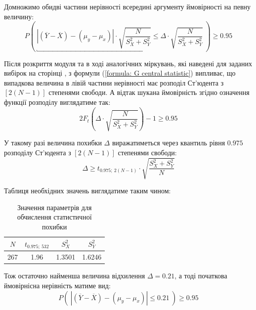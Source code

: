 Домножимо обидві частини нерівності всередині аргументу ймовірності на певну величину:
\begin{equation*}
    P\left(\ \underbracket{\left| (\overline{Y}-\overline{X})-(\mu_y-\mu_x) \right| \cdot \sqrt{\frac{N}{S_X^2+S_Y^2}}} 
    \leqslant \Delta \cdot \sqrt{\frac{N}{S_X^2+S_Y^2}} \ \right)\geqslant 0.95
\end{equation*}

Після розкриття модуля та в ході аналогічних міркувань, які наведені для заданих вибірок на сторінці 
\pageref{page: seaching central statistic}, з формули (\ref{formula: G central statistic}) випливає, що 
випадкова величина в лівій частини нерівності має розподіл Ст'юдента з $\left[ 2(N-1) \right]$ степенями 
свободи. А відтак шукана ймовірність згідно означення функції розподілу виглядатиме так:
\begin{equation*}
    2F_t\left( \Delta \cdot \sqrt{\frac{N}{S_X^2+S_Y^2}} \right)-1 \geqslant 0.95
\end{equation*}

У такому разі величина похибки $\Delta$ виражатиметься через квантиль рівня $0.975$ розподілу Ст'юдента з 
$\left[ 2(N-1) \right]$ степенями свободи:
\begin{equation}
    \Delta \geqslant t_{0.975;\ 2(N-1)} \cdot \sqrt{\frac{S_X^2+S_Y^2}{N}} \label{formula: percentage point}
\end{equation}

Таблиця необхідних значень виглядатиме таким чином:

\vspace{0.8cm}
\begin{table}[H]
    \begin{center}
        \begin{tabular}{||c|c|c|c||}
            \hline
            $N$ & $t_{0.975;\ 532}$ & $S_X^2$ & $S_Y^2$ \\
            \hline \hline
            267 & 1.96 & 1.3501 & 1.6246 \\
            \hline
        \end{tabular}
        \caption{Значення параметрів для обчислення статистичної похибки}
        \label{table: UKR percentage point}
    \end{center}
\end{table}

Тож остаточно найменша величина відхилення $\Delta = 0.21$, а тоді початкова ймовірнісна нерівність матиме вид:
\begin{equation*}
    P\left(\ \left| (\overline{Y}-\overline{X})-(\mu_y-\mu_x) \right| \leqslant 0.21\ \right)\geqslant 0.95
\end{equation*}


